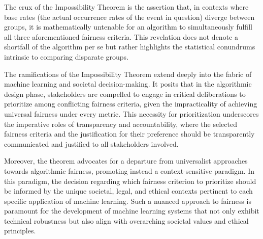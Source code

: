 The crux of the Impossibility Theorem is the assertion that, in contexts where base rates (the actual occurrence rates of the event in question) diverge between groups, it is mathematically untenable for an algorithm to simultaneously fulfill all three aforementioned fairness criteria. This revelation does not denote a shortfall of the algorithm per se but rather highlights the statistical conundrums intrinsic to comparing disparate groups.

The ramifications of the Impossibility Theorem extend deeply into the fabric of machine learning and societal decision-making. It posits that in the algorithmic design phase, stakeholders are compelled to engage in critical deliberations to prioritize among conflicting fairness criteria, given the impracticality of achieving universal fairness under every metric. This necessity for prioritization underscores the imperative roles of transparency and accountability, where the selected fairness criteria and the justification for their preference should be transparently communicated and justified to all stakeholders involved.

Moreover, the theorem advocates for a departure from universalist approaches towards algorithmic fairness, promoting instead a context-sensitive paradigm. In this paradigm, the decision regarding which fairness criterion to prioritize should be informed by the unique societal, legal, and ethical contexts pertinent to each specific application of machine learning. Such a nuanced approach to fairness is paramount for the development of machine learning systems that not only exhibit technical robustness but also align with overarching societal values and ethical principles.




